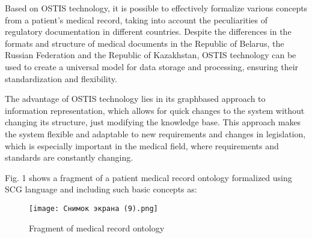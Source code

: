 \documentclass{article}
\begin{document}
\begin{multicols}{2}
\par Based on OSTIS technology, it is possible to effectively formalize various concepts from a patient’s medical record, taking into account the peculiarities of regulatory documentation in different countries. Despite the differences in the formats and structure of medical documents in the Republic of Belarus, the Russian Federation and the Republic of Kazakhstan, OSTIS technology can be used to create a universal model for data storage and processing, ensuring their standardization and flexibility.
\par The advantage of OSTIS technology lies in its graphbased approach to information representation, which allows for quick changes to the system without changing its structure, just modifying the knowledge base. This approach makes the system flexible and adaptable to new requirements and changes in legislation, which is especially important in the medical field, where requirements and standards are constantly changing. 
\par Fig. 1 shows a fragment of a patient medical record ontology formalized using SCG language and including such basic concepts as: 
\end{multicols}
\newpage
\begin{figure}[H]
    \centering
\texttt{[image: Снимок экрана (9).png]}
    \caption{Fragment of medical record ontology}
\end{figure}
\end{document}
